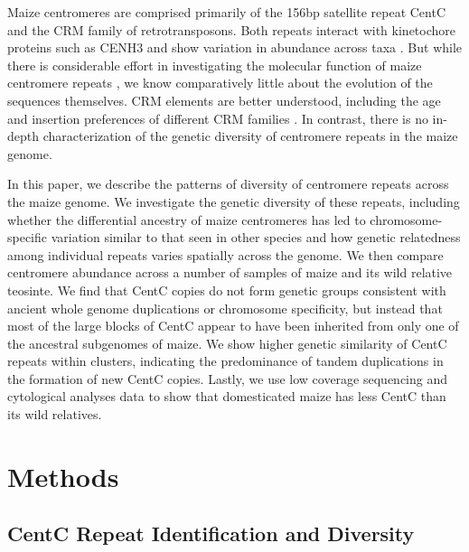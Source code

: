 Maize centromeres are comprised primarily of the 156bp satellite repeat CentC and the CRM family of retrotransposons.  Both repeats interact with  kinetochore proteins such as CENH3 \citep{Wolfgruber2009, Zhong2002} and show  variation in  abundance across taxa \citep{Albert2010}.  But while there is considerable effort in investigating the molecular function of maize centromere repeats \citep{Ananiev1998B, Nagaki2003, Wolfgruber2009}, we know comparatively little about the evolution of the sequences themselves. CRM elements are better understood, including the age and insertion preferences of different CRM families \citep{Wolfgruber2009, Sharma2008}.  In contrast, there is no in-depth characterization of the genetic diversity of centromere repeats in the maize genome.  

In this paper, we describe the patterns of diversity of centromere repeats across the maize genome.  We investigate the genetic diversity of these repeats, including whether the differential ancestry of maize centromeres \citep{Wang2012} has led to chromosome-specific variation similar to that seen in other species \citep{Kawabe2005, Pontes2004} and how genetic relatedness among individual repeats varies spatially across the genome.  We then compare centromere abundance across a number of samples of maize and its wild relative teosinte.  We find that CentC copies do not form genetic groups consistent with ancient whole genome duplications or chromosome specificity, but instead that most of the large blocks of CentC appear to have been inherited from only one of the ancestral subgenomes of maize.  We show higher genetic similarity of CentC repeats within clusters, indicating the predominance of tandem duplications in the formation of new CentC copies.  Lastly, we use low coverage sequencing and cytological analyses data to show that domesticated maize has less CentC than its wild relatives.

\section*{Methods} 
\label{methods}

\subsection*{CentC Repeat Identification and Diversity}

